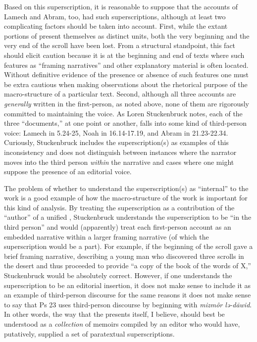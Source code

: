 Based on this superscription, it is reasonable to suppose that the accounts of Lamech and Abram, too, had such superscriptions, although at least two complicating factors should be taken into account. First, while the extant portions of \ga present themselves as distinct units, both the very beginning and the very end of the scroll have been lost. From a structural standpoint, this fact should elicit caution because it is at the beginning and end of texts where such features as ``framing narratives'' and other explanatory material is often located. Without definitive evidence of the presence or absence of such features one must be extra cautious when making observations about the rhetorical purpose of the macro-structure of a particular text. Second, although all three accounts are \emph{generally} written in the first-person, as noted above, none of them are rigorously committed to maintaining the voice. As Loren Stuckenbruck notes, each of the three ``documents,'' at one point or another, falls into some kind of third-person voice: Lamech in 5.24-25, Noah in 16.14-17.19, and Abram in 21.23-22.34. Curiously, Stuckenbruck includes the superscription(s) as examples of this inconsistency and does not distinguish between instances where the narrator moves into the third person \emph{within} the narrative and cases where one might suppose the presence of an editorial voice.

The problem of whether to understand the superscription(s) as ``internal'' to the work is a good example of how the macro-structure of the work is important for this kind of analysis. By treating the superscription as a contribution of the ``author'' of a unified \ga, Stuckenbruck understands the superscription to be ``in the third person'' and would (apparently) treat each first-person account as an embedded narrative within a larger framing narrative (of which the superscription would be a part). For example, if the beginning of the scroll gave a brief framing narrative, describing a young man who discovered three scrolls in the desert and thus proceeded to provide ``a copy of the book of the words of X,'' Stuckenbruck would be absolutely correct. However, if one understands the superscription to be an editorial insertion, it does not make sense to include it as an example of third-person discourse for the same reasons it does not make sense to say that Ps 23 uses third-person discourse by beginning with \emph{mizmôr lə-dāwid}.\autocites[315--316]{stuckenbruck_roitman-etal2011}[See also][15--16. Even supposing a single author for \ga, as Stuckenbruck and others imply, I am still inclined to consider the superscriptions separately from the former examples because they would exist outside the frame of each embedded narrative.]{bernstein_chazon-etal1999} In other words, the way that the \ga presents itself, I believe, should best be understood as a \emph{collection} of memoirs compiled by an editor who would have, putatively, supplied a set of paratextual superscriptions.

